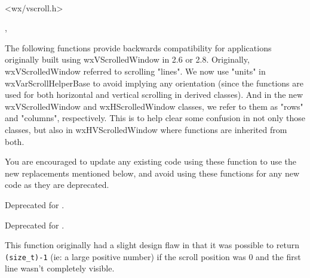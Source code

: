 \\


<wx/vscroll.h>




,
\rtfsp{}




\label{wxvscrolledwindowbackwardcompatibility}

The following functions provide backwards compatibility for applications
originally built using wxVScrolledWindow in 2.6 or 2.8. Originally,
wxVScrolledWindow referred to scrolling "lines". We now use "units" in
wxVarScrollHelperBase to avoid implying any orientation (since the functions
are used for both horizontal and vertical scrolling in derived classes). And
in the new wxVScrolledWindow and wxHScrolledWindow classes, we refer to them
as "rows" and "columns", respectively. This is to help clear some confusion
in not only those classes, but also in wxHVScrolledWindow where functions
are inherited from both.

You are encouraged to update any existing code using these function to use
the new replacements mentioned below, and avoid using these functions for
any new code as they are deprecated.


Deprecated for .


Deprecated for .

This function originally had a slight design flaw in that it was possible to
return \texttt{(size\_t)-1} (ie: a large positive number) if the scroll
position was 0 and the first line wasn't completely visible.

